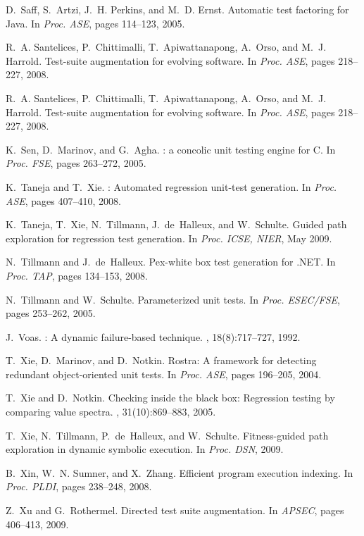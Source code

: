 \documentclass{sig-alternate}
\begin{document}
\begin{thebibliography}{10}
\begin{scriptsize}
D.~Saff, S.~Artzi, J.~H. Perkins, and M.~D. Ernst.
\newblock Automatic test factoring for {Java}.
\newblock In {\em Proc. ASE}, pages 114--123, 2005.

R.~A. Santelices, P.~Chittimalli, T.~Apiwattanapong, A.~Orso, and M.~J.
  Harrold.
\newblock Test-suite augmentation for evolving software.
\newblock In {\em Proc. ASE}, pages 218--227, 2008.

R.~A. Santelices, P.~Chittimalli, T.~Apiwattanapong, A.~Orso, and M.~J.
  Harrold.
\newblock Test-suite augmentation for evolving software.
\newblock In {\em Proc. ASE}, pages 218--227, 2008.

K.~Sen, D.~Marinov, and G.~Agha.
: a concolic unit testing engine for {C}.
\newblock In {\em Proc. FSE}, pages 263--272, 2005.

K.~Taneja and T.~Xie.
: Automated regression unit-test generation.
\newblock In {\em Proc. ASE}, pages 407--410, 2008.

K.~Taneja, T.~Xie, N.~Tillmann, J.~de~Halleux, and W.~Schulte.
\newblock Guided path exploration for regression test generation.
\newblock In {\em Proc. ICSE, NIER}, May 2009.

N.~Tillmann and J.~de~Halleux.
\newblock Pex-white box test generation for {.{N}{E}{T}}.
\newblock In {\em Proc. TAP}, pages 134--153, 2008.

N.~Tillmann and W.~Schulte.
\newblock Parameterized unit tests.
\newblock In {\em Proc. ESEC/FSE}, pages 253--262, 2005.

J.~Voas.
: A dynamic failure-based technique.
, 18(8):717--727, 1992.

T.~Xie, D.~Marinov, and D.~Notkin.
\newblock Rostra: A framework for detecting redundant object-oriented unit
  tests.
\newblock In {\em Proc. ASE}, pages 196--205, 2004.

T.~Xie and D.~Notkin.
\newblock Checking inside the black box: Regression testing by comparing value
  spectra.
, 31(10):869--883, 2005.

T.~Xie, N.~Tillmann, P.~de~Halleux, and W.~Schulte.
\newblock Fitness-guided path exploration in dynamic symbolic execution.
\newblock In {\em Proc. DSN}, 2009.

B.~Xin, W.~N. Sumner, and X.~Zhang.
\newblock Efficient program execution indexing.
\newblock In {\em Proc. PLDI}, pages 238--248, 2008.

Z.~Xu and G.~Rothermel.
\newblock Directed test suite augmentation.
\newblock In {\em APSEC}, pages 406--413, 2009.

\end{scriptsize}
\end{thebibliography}
\end{document}
